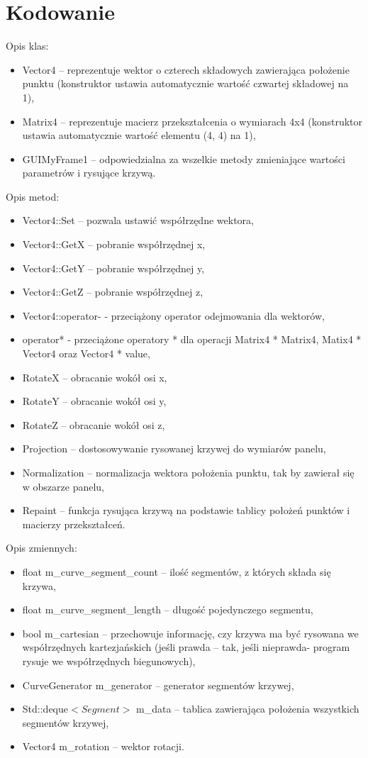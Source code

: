 \section{Kodowanie}
Opis klas:
\begin{itemize}
	\item Vector4 – reprezentuje wektor o czterech składowych zawierająca położenie punktu (konstruktor ustawia automatycznie wartość czwartej składowej na 1),
	\item Matrix4 – reprezentuje macierz przekształcenia o wymiarach 4x4 (konstruktor ustawia automatycznie wartość elementu (4, 4) na 1),
	\item GUIMyFrame1 – odpowiedzialna za wszelkie metody zmieniające wartości parametrów i rysujące krzywą.
\end{itemize}

Opis metod:
\begin{itemize}
	\item	Vector4::Set – pozwala ustawić współrzędne wektora,
	\item 	Vector4::GetX – pobranie współrzędnej x,
	\item 	Vector4::GetY – pobranie współrzędnej y,
	\item 	Vector4::GetZ – pobranie współrzędnej z,
	\item 	Vector4::operator- - przeciążony operator odejmowania dla wektorów,
	\item 	operator* - przeciążone operatory * dla operacji Matrix4 * Matrix4, Matix4 * Vector4 oraz Vector4 * value,
	\item 	RotateX – obracanie wokół osi x,
	\item 	RotateY – obracanie wokół osi y,
	\item 	RotateZ – obracanie wokół osi z,
	\item 	Projection – dostosowywanie rysowanej krzywej do wymiarów panelu,
	\item 	Normalization – normalizacja wektora położenia punktu, tak by zawierał się w obszarze panelu,
	\item 	Repaint – funkcja rysująca krzywą na podstawie tablicy położeń punktów i macierzy przekształceń.
\end{itemize}

Opis zmiennych:
\begin{itemize}
\item	float m\_curve\_segment\_count – ilość segmentów, z których składa się krzywa,
\item	float m\_curve\_segment\_length – długość pojedynczego segmentu,
\item	bool m\_cartesian – przechowuje informację, czy krzywa ma być rysowana we współrzędnych kartezjańskich (jeśli prawda – tak, jeśli nieprawda- program rysuje we współrzędnych biegunowych),
\item	CurveGenerator m\_generator – generator segmentów krzywej,
\item 	Std::deque$<Segment>$ m\_data – tablica zawierająca położenia wszystkich segmentów krzywej,
\item	Vector4 m\_rotation – wektor rotacji.

\end{itemize}

